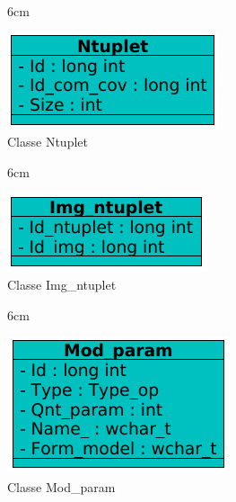 \begin{figure}[!ht]{6cm}
  \caption{Classe Ntuplet} \label{ntu}
  \centering
  \includegraphics[width=0.7\hsize]{figuras/12.png}
\end{figure}

\begin{figure}[!ht]{6cm}
  \caption{Classe Img\_ntuplet} \label{imgtu}
  \centering
  \includegraphics[width=0.7\hsize]{figuras/14.png}
\end{figure}

\begin{figure}[!ht]{6cm}
  \caption{Classe Mod\_param} \label{modpar}
  \centering
  \includegraphics[width=0.7\hsize]{figuras/11.png}
\end{figure}

